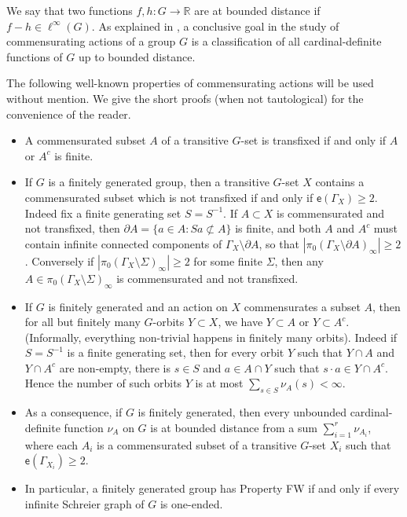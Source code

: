 \documentclass[11pt]{amsart}
\newcommand{\R}{\ensuremath{\mathbb{R}}}%
\newcommand{\esf}{\ensuremath{\mathsf{e}}}
\theoremstyle{definition}
\theoremstyle{plain}
\newtheorem{main thm}{Theorem}
\theoremstyle{remark}
\theoremstyle{plain}
\begin{document}
 We say that two functions $f, h\colon G\to \R$ are at bounded distance if $f-h\in \ell^\infty(G)$.  As explained in \cite[\S2.E]{Cor-FWsurvey}, a conclusive goal in the study of commensurating actions of a group $G$  is a classification of all cardinal-definite functions of $G$ {up to bounded distance}. 

The following well-known properties of commensurating actions will be used without mention. We give the short proofs (when not tautological) for the convenience of the reader.

\begin{itemize}

\item A commensurated subset $A$ of a transitive $G$-set is transfixed if and only if $A$ or $A^c$ is finite. 
\item If $G$ is a finitely generated group, then a transitive $G$-set $X$ contains a commensurated subset which is not transfixed if and only if $\esf(\Gamma_X)\ge 2$. Indeed fix a finite generating set $S=S^{-1}$. If $A\subset X$ is commensurated and not transfixed, then $\partial A=\{a\in A\colon Sa\not \subset A\}$ is finite, and both $A$ and $A^c$ must contain infinite connected components of $\Gamma_X\setminus \partial A$, so that $|\pi_0(\Gamma_X\setminus \partial A)_\infty|\ge 2$. Conversely if $|\pi_0(\Gamma_X\setminus \Sigma)_\infty|\ge 2$ for some finite $\Sigma$, then any $A\in\pi_0(\Gamma_X\setminus \Sigma)_\infty$ is commensurated and not transfixed. 


\item If $G$ is finitely generated and an action on $X$ commensurates a subset $A$, then for all but finitely many $G$-orbits $Y\subset X$, we have $Y\subset A$ or $Y\subset A^c$. (Informally, everything non-trivial happens in finitely many orbits). Indeed if $S=S^{-1}$ is a finite generating set, then for every orbit $Y$ such that $Y\cap A$ and $Y\cap A^c$ are non-empty, there is $s\in S$ and $a\in A\cap Y$ such that $s\cdot a\in Y\cap A^c$. Hence the number of such orbits $Y$ is at most $\sum_{s\in S} \nu_A(s)<\infty$.

\item As a consequence, if $G$ is finitely generated, then every unbounded cardinal-definite function $\nu_A$ on $G$ is at bounded distance from a sum $\sum_{i=1}^r \nu_{A_i}$, where each $A_i$ is a commensurated subset of a transitive $G$-set $X_i$  such that $\esf(\Gamma_{X_i})\ge 2$. 

\item In particular, a finitely generated group has Property FW if and only if every infinite Schreier graph of $G$ is one-ended.



\end{itemize}
\end{document}
